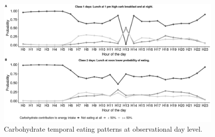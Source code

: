 \begin{figure}
	\centering
	\includegraphics{Figures/class1mlcalevel1.png}
	\decoRule
	\caption[Level 1 Classes in MLCA]{Carbohydrate temporal eating patterns at observational day level.}
	\label{fig:MLCAfig1}
\end{figure}



